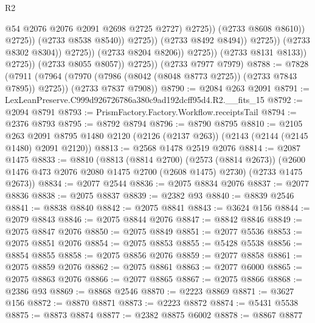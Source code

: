 \begin{lexlean}{R2}
\begin{coremodule}
                                                    @54
                                                    @2076
                                                    @2076
                                                    @2091
                                                    @2698
                                                    @2725
                                                    @2727)
                                                  @2725))
                                              (@2733 @8608 @8610))
                                            @2725))
                                        (@2733 @8538 @8540))
                                      @2725))
                                  (@2733 @8492 @8494))
                                @2725))
                            (@2733 @8302 @8304))
                          @2725))
                      (@2733 @8204 @8206))
                    @2725))
                (@2733 @8131 @8133))
              @2725))
          (@2733 @8055 @8057))
        @2725))
    (@2733 @7977 @7979)
@8788 := @7828
    (@7911
      (@7964 (@7970 (@7986 (@8042 (@8048 @8773 @2725)) (@2733 @7843 @7895)) @2725))
      (@2733 @7837 @7908))
@8790 := @2084 @263 @2091
@8791 := LexLeanPreserve.C999d926726786a380c9ad192dcff95d4.R2.__fits_15
@8792 := @2094 @8791
@8793 := PrismFactory.Factory.Workflow.receiptsTail
@8794 := @2376 @8793
@8795 := @8792 @8794
@8796 := @8790 @8795
@8810 := @2105
    @263
    @2091
    @8795
    @1480
    @2120
    (@2126 (@2137 @263))
    (@2143 (@2144 (@2145 @1480) @2091 @2120))
@8813 := @2568 @1478 @2519 @2076
@8814 := @2087 @1475
@8833 := @8810
    (@8813
      (@8814 @2700)
      (@2573 (@8814 @2673))
      (@2600 @1476 @473 @2076 @2080 @1475 @2700 (@2608 @1475) @2730)
      (@2733 @1475 @2673))
@8834 := @2077 @2544
@8836 := @2075 @8834 @2076
@8837 := @2077 @8836
@8838 := @2075 @8837
@8839 := @2382 @93
@8840 := @8839 @2546
@8841 := @8838 @8840
@8842 := @2075 @8841
@8843 := @3624 @156
@8844 := @2079 @8843
@8846 := @2075 @8844 @2076
@8847 := @8842 @8846
@8849 := @2075 @8847 @2076
@8850 := @2075 @8849
@8851 := @2077 @5536
@8853 := @2075 @8851 @2076
@8854 := @2075 @8853
@8855 := @5428 @5538
@8856 := @8854 @8855
@8858 := @2075 @8856 @2076
@8859 := @2077 @8858
@8861 := @2075 @8859 @2076
@8862 := @2075 @8861
@8863 := @2077 @6000
@8865 := @2075 @8863 @2076
@8866 := @2077 @8865
@8867 := @2075 @8866
@8868 := @2386 @93
@8869 := @8868 @2546
@8870 := @2223 @8869
@8871 := @3627 @156
@8872 := @8870 @8871
@8873 := @2223 @8872
@8874 := @5431 @5538
@8875 := @8873 @8874
@8877 := @2382 @8875 @6002
@8878 := @8867 @8877

\end{coremodule}
\end{lexlean}
